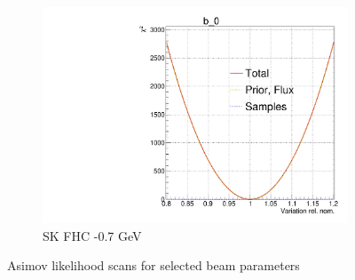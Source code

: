 \begin{figure}[h]
\begin{subfigure}[t]{0.32\textwidth}
	\includegraphics[width=\textwidth, trim={0mm 0mm 0mm 11mm}, clip,page=55]{figures/mach3/Asimov/Full_LLHscan_18July_BeRPA_U_ND280logL_scan}
	\caption{SK FHC -0.7 GeV}
\end{subfigure}
\caption{Asimov likelihood scans for selected beam parameters}
\label{fig:beam_asimov_llh}
\end{figure}

